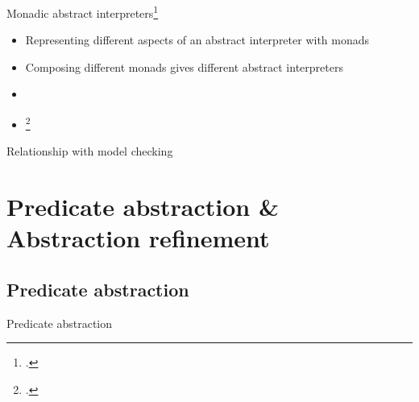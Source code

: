 \documentclass[aspectratio=169,14pt]{beamer}
\begin{document}
\begin{frame}{Monadic abstract interpreters\footcite{sergey2013monadic}}
  \begin{itemize}
  \item Representing different aspects of an abstract interpreter with monads
  \item Composing different monads gives different abstract interpreters
  \item {}
  \item {}\footcite{darais2015galois}
  \end{itemize}
\end{frame}

\begin{frame}{Relationship with model checking}
\end{frame}

\section{Predicate abstraction \& Abstraction refinement}
\subsection{Predicate abstraction}
\begin{frame}{Predicate abstraction}
\end{frame}
\end{document}

